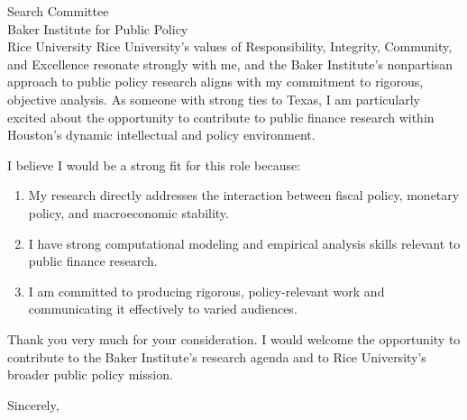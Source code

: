 \documentclass[11pt,letterpaper]{letter}
\begin{document}
\begin{letter}{
Search Committee \\
Baker Institute for Public Policy \\
Rice University
}
Rice University’s values of Responsibility, Integrity, Community, and Excellence resonate strongly with me, and the Baker Institute’s nonpartisan approach to public policy research aligns with my commitment to rigorous, objective analysis. As someone with strong ties to Texas, I am particularly excited about the opportunity to contribute to public finance research within Houston’s dynamic intellectual and policy environment.

I believe I would be a strong fit for this role because:
\begin{enumerate}
    \item My research directly addresses the interaction between fiscal policy, monetary policy, and macroeconomic stability.
    \item I have strong computational modeling and empirical analysis skills relevant to public finance research.
    \item I am committed to producing rigorous, policy-relevant work and communicating it effectively to varied audiences.
\end{enumerate}

Thank you very much for your consideration. I would welcome the opportunity to contribute to the Baker Institute’s research agenda and to Rice University’s broader public policy mission.

\closing{Sincerely,}

\end{letter}
\end{document}
